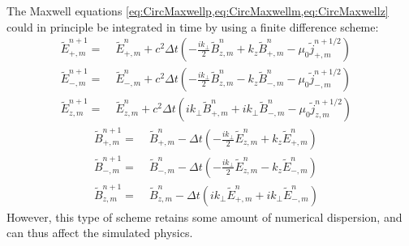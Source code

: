 \documentclass[a4paper]{article}   	%
\newcommand{\tB}[2]{\tilde{B}_{#1,m}^{#2}}
\newcommand{\tE}[2]{\tilde{E}_{#1,m}^{#2}}
\newcommand{\tj}[2]{\tilde{j}_{#1,m}^{#2}}
\begin{document}
The Maxwell equations
\cref{eq:CircMaxwellp,eq:CircMaxwellm,eq:CircMaxwellz} could in
principle be integrated in time by using a finite difference scheme:
\begin{align*}
\tE{+}{n+1} = \; & \tE{+}{n} + 
c^2\Delta t\left(-\frac{ik_\perp }{2} \tB{z}{n} + k_z\tB{+}{n}
- \mu_0 \tj{+}{n+1/2} \right) & \\
\tE{-}{n+1} =\; & \tE{-}{n} +
c^2\Delta t\left(- \frac{ik_\perp }{2} \tB{z}{n} - k_z\tB{-}{n}
- \mu_0 \tj{-}{n+1/2} \right) &\\
\tE{z}{n+1} =\; & \tE{z}{n} + 
c^2\Delta t\left(ik_\perp \tB{+}{n} + ik_\perp \tB{-}{n}
- \mu_0 \tj{z}{n+1/2} \right)  &
\end{align*}
\begin{align*}
\tB{+}{n+1} = \; & \tB{+}{n} - 
\Delta t\left(-\frac{ik_\perp }{2} \tE{z}{n} + k_z\tE{+}{n}
\right) & \\
\tB{-}{n+1} =\; & \tB{-}{n} - 
\Delta t\left(- \frac{ik_\perp }{2} \tE{z}{n} - k_z\tE{-}{n}
\right) &\\
\tB{z}{n+1} =\; & \tB{z}{n} - 
\Delta t\left(ik_\perp \tE{+}{n} + ik_\perp \tE{-}{n}
\right) &
\end{align*}
However, this type of scheme retains some amount of numerical dispersion, and can
thus affect the simulated physics.
\end{document}
